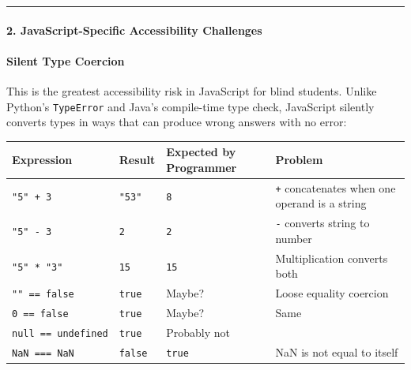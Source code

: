 \documentclass[
  justified,
  openright,
]{tufte-book}
\let\subsection\paragraph
\let\paragraph\paragraph
\let\subsection\paragraph
\let\paragraph\paragraph
\begin{document}
\begin{center}\rule{0.5\linewidth}{0.5pt}\end{center}

\subsection{2. JavaScript-Specific Accessibility
Challenges}\label{javascript-specific-accessibility-challenges}

\subsection{Silent Type Coercion}\label{silent-type-coercion}

This is the greatest accessibility risk in JavaScript for blind
students. Unlike Python's \texttt{TypeError} and Java's compile-time
type check, JavaScript silently converts types in ways that can produce
wrong answers with no error:

\begin{fullwidth}{\def\LTcaptype{none} %
\begin{longtable}[]{@{}
  >{\raggedright\arraybackslash}p{}
  >{\raggedright\arraybackslash}p{}
  >{\raggedright\arraybackslash}p{}
  >{\raggedright\arraybackslash}p{}@{}}
\toprule\noalign{}
\begin{minipage}[b]{\linewidth}\raggedright
Expression
\end{minipage} & \begin{minipage}[b]{\linewidth}\raggedright
Result
\end{minipage} & \begin{minipage}[b]{\linewidth}\raggedright
Expected by Programmer
\end{minipage} & \begin{minipage}[b]{\linewidth}\raggedright
Problem
\end{minipage} \\
\midrule\noalign{}
\endhead
\bottomrule\noalign{}
\endlastfoot
\texttt{"5"\ +\ 3} & \texttt{"53"} & \texttt{8} & \texttt{+}
concatenates when one operand is a string \\
\texttt{"5"\ -\ 3} & \texttt{2} & \texttt{2} & \texttt{-} converts
string to number \\
\texttt{"5"\ *\ "3"} & \texttt{15} & \texttt{15} & Multiplication
converts both \\
\texttt{""\ ==\ false} & \texttt{true} & Maybe? & Loose equality
coercion \\
\texttt{0\ ==\ false} & \texttt{true} & Maybe? & Same \\
\texttt{null\ ==\ undefined} & \texttt{true} & Probably not & \\
\texttt{NaN\ ===\ NaN} & \texttt{false} & \texttt{true} & NaN is not
equal to itself \\
\end{longtable}
}
\end{fullwidth}
\end{document}
